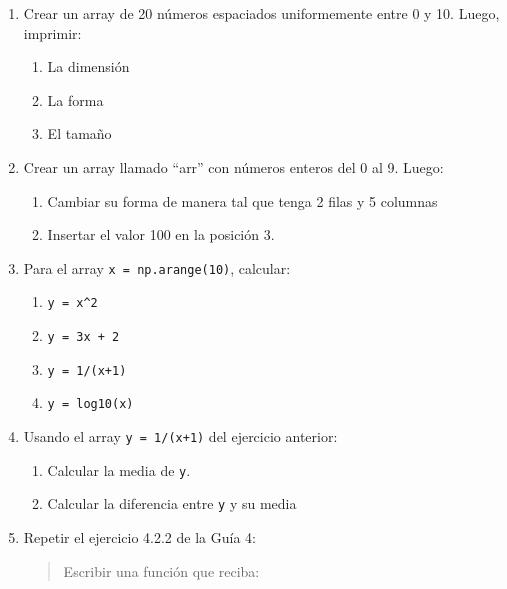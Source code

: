 \documentclass[
  letterpaper,
  DIV=11,
  numbers=noendperiod]{scrreprt}
\providecommand{\tightlist}{%
  \setlength{\itemsep}{0pt}\setlength{\parskip}{0pt}}\usepackage{longtable,booktabs,array}
\begin{document}
\begin{enumerate}
\def\labelenumi{\arabic{enumi}.}
\item
  Crear un array de 20 números espaciados uniformemente entre 0 y 10.
  Luego, imprimir:

  \begin{enumerate}
  \def\labelenumii{\alph{enumii}.}
  \tightlist
  \item
    La dimensión
  \item
    La forma
  \item
    El tamaño
  \end{enumerate}
\item
  Crear un array llamado ``arr'' con números enteros del 0 al 9. Luego:

  \begin{enumerate}
  \def\labelenumii{\alph{enumii}.}
  \tightlist
  \item
    Cambiar su forma de manera tal que tenga 2 filas y 5 columnas
  \item
    Insertar el valor 100 en la posición 3.
  \end{enumerate}
\item
  Para el array \texttt{x\ =\ np.arange(10)}, calcular:

  \begin{enumerate}
  \def\labelenumii{\alph{enumii}.}
  \tightlist
  \item
    \texttt{y\ =\ x\^{}2}
  \item
    \texttt{y\ =\ 3x\ +\ 2}
  \item
    \texttt{y\ =\ 1/(x+1)}
  \item
    \texttt{y\ =\ log10(x)}
  \end{enumerate}
\item
  Usando el array \texttt{y\ =\ 1/(x+1)} del ejercicio anterior:

  \begin{enumerate}
  \def\labelenumii{\alph{enumii}.}
  \tightlist
  \item
    Calcular la media de \texttt{y}.
  \item
    Calcular la diferencia entre \texttt{y} y su media
  \end{enumerate}
\item
  Repetir el ejercicio 4.2.2 de la Guía 4:

  \begin{quote}
  Escribir una función que reciba:\\


\end{quote}
\end{enumerate}
\end{document}
